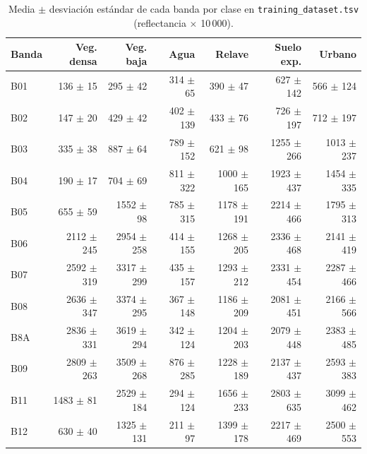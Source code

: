 \begin{table}[htbp]
 \centering
 \footnotesize
\setlength{\tabcolsep}{4pt}
 \caption{Media $\pm$ desviación estándar de cada banda por clase en \texttt{training\_dataset.tsv} (reflectancia $\times$ 10\,000).}
 \label{tab:estadistica}
 \begin{tabular}{lrrrrrr}
  \toprule
  Banda & Veg. densa & Veg. baja & Agua & Relave & Suelo exp. & Urbano \\
  \midrule
  B01 & 136 $\pm$ 15 & 295 $\pm$ 42 & 314 $\pm$ 65 & 390 $\pm$ 47 & 627 $\pm$ 142 & 566 $\pm$ 124 \\
  B02 & 147 $\pm$ 20 & 429 $\pm$ 42 & 402 $\pm$ 139 & 433 $\pm$ 76 & 726 $\pm$ 197 & 712 $\pm$ 197 \\
  B03 & 335 $\pm$ 38 & 887 $\pm$ 64 & 789 $\pm$ 152 & 621 $\pm$ 98 & 1255 $\pm$ 266 & 1013 $\pm$ 237 \\
  B04 & 190 $\pm$ 17 & 704 $\pm$ 69 & 811 $\pm$ 322 & 1000 $\pm$ 165 & 1923 $\pm$ 437 & 1454 $\pm$ 335 \\
  B05 & 655 $\pm$ 59 & 1552 $\pm$ 98 & 785 $\pm$ 315 & 1178 $\pm$ 191 & 2214 $\pm$ 466 & 1795 $\pm$ 313 \\
  B06 & 2112 $\pm$ 245 & 2954 $\pm$ 258 & 414 $\pm$ 155 & 1268 $\pm$ 205 & 2336 $\pm$ 468 & 2141 $\pm$ 419 \\
  B07 & 2592 $\pm$ 319 & 3317 $\pm$ 299 & 435 $\pm$ 157 & 1293 $\pm$ 212 & 2331 $\pm$ 454 & 2287 $\pm$ 466 \\
  B08 & 2636 $\pm$ 347 & 3374 $\pm$ 295 & 367 $\pm$ 148 & 1186 $\pm$ 209 & 2081 $\pm$ 451 & 2166 $\pm$ 566 \\
  B8A & 2836 $\pm$ 331 & 3619 $\pm$ 294 & 342 $\pm$ 124 & 1204 $\pm$ 203 & 2079 $\pm$ 448 & 2383 $\pm$ 485 \\
  B09 & 2809 $\pm$ 263 & 3509 $\pm$ 268 & 876 $\pm$ 285 & 1228 $\pm$ 189 & 2137 $\pm$ 437 & 2593 $\pm$ 383 \\
  B11 & 1483 $\pm$ 81 & 2529 $\pm$ 184 & 294 $\pm$ 124 & 1656 $\pm$ 233 & 2803 $\pm$ 635 & 3099 $\pm$ 462 \\
  B12 & 630 $\pm$ 40 & 1325 $\pm$ 131 & 211 $\pm$ 97 & 1399 $\pm$ 178 & 2217 $\pm$ 469 & 2500 $\pm$ 553 \\
  \bottomrule
 \end{tabular}
\end{table}
